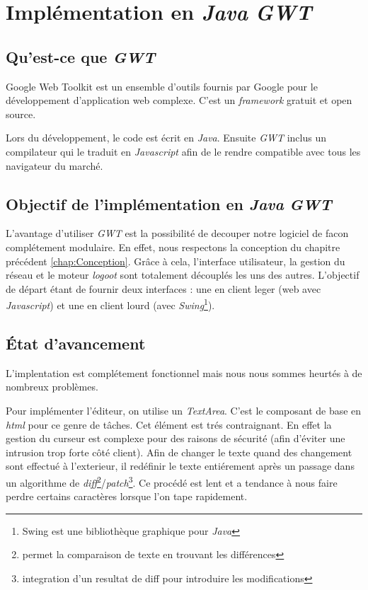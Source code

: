 \section{Implémentation en \emph{Java} \emph{GWT}}
  \label{sec:gwt}
  \subsection{Qu'est-ce que \emph{GWT}}
  Google Web Toolkit est un ensemble d'outils fournis par Google pour le
   développement d'application web complexe. C'est un \emph{framework} gratuit
   et open source.
   
   Lors du développement, le code est écrit en  \emph{Java}. Ensuite \emph{GWT} 
   inclus un compilateur qui le traduit en \emph{Javascript} afin de le rendre 
   compatible avec tous les navigateur du marché.
   
  \subsection{Objectif de l'implémentation en \emph{Java} \emph{GWT}}
  L'avantage d'utiliser \emph{GWT} est la possibilité de decouper notre 
  logiciel de facon complétement modulaire. En effet, nous respectons la
  conception du chapitre précédent \ref{chap:Conception}. Grâce à cela, 
  l'interface utilisateur, la gestion du réseau et le moteur \emph{logoot}
  sont totalement découplés les uns des autres. L'objectif de départ étant
  de fournir deux interfaces : une en client leger (web avec \emph{Javascript})
  et une en client lourd (avec \emph{Swing}\footnote{Swing est une bibliothèque
  graphique pour \emph{Java}}). 
  
  \subsection{État d'avancement}
	L'implentation est complétement fonctionnel mais nous nous sommes heurtés
	à de nombreux problèmes.
	
	\label{sec:textarea}
	Pour implémenter l'éditeur, on utilise un \emph{TextArea}. C'est le 
	composant de base en \emph{html} pour ce genre de tâches. Cet élément 
	est trés contraignant. En effet la gestion du curseur est complexe
	pour des raisons de sécurité (afin d'éviter une intrusion trop forte côté 
	client). Afin de changer le texte quand des changement sont effectué à 
	l'exterieur, il redéfinir le texte entiérement après un 
	passage dans un algorithme de \emph{diff}\footnote{permet la comparaison 
	de texte en trouvant les différences}/\emph{patch}\footnote{integration
	d'un resultat de diff pour introduire les modifications}. Ce procédé
	est lent et a tendance à nous faire perdre certains caractères lorsque
	l'on tape rapidement.
	
